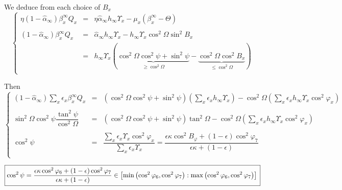\documentclass[aps,onecolumn,10pt]{revtex4}
\begin{document}
\begin{itemize}
We deduce from each choice of $B_x$
\begin{equation}
\left\lbrace
\begin{array}{rcl}
	\eta (1-\hat\alpha_\infty) \beta_x^\infty Q_x & = & \eta \hat\alpha_\infty h_\infty \Upsilon_x - \mu_x\left(\beta_x^\infty - \Theta \right)\\
	\\
	 (1-\hat\alpha_\infty) \beta_x^\infty Q_x & = & \hat\alpha_\infty h_\infty \Upsilon_x -   {h_\infty\Upsilon_x\cos^2\Omega}\sin^2 B_x\\
	 & = &  h_\infty \Upsilon_x \left( \underbrace{\cos^2\Omega \cos^2\psi + \sin^2\psi}_{\geq \cos^2\Omega} - \underbrace{\cos^2\Omega \cos^2 B_x}_{\leq\cos^2\Omega} \right)\\
\end{array}
\right.
\end{equation}

Then
\begin{equation}
\left\lbrace
\begin{array}{rcl}
 (1-\hat\alpha_\infty) \sum_x \epsilon_x \beta_x^\infty Q_x & = & 
 \left(\cos^2\Omega \cos^2\psi + \sin^2\psi\right) \left(\sum_x \epsilon_x h_\infty \Upsilon_x\right) - \cos^2 \Omega \left(\sum_x \epsilon_x h_\infty \Upsilon_x \cos^2 \varphi_x \right)\\
 \\
\sin^2\Omega  \cos^2\psi \dfrac{\tan^2\psi}{\cos^2\Omega} & = & \left(\cos^2\Omega \cos^2\psi + \sin^2\psi\right) \tan^2 \Omega
 - \cos^2 \Omega \left(\sum_x \epsilon_x h_\infty \Upsilon_x \cos^2 \varphi_x \right)\\
 \\
 \cos^2\psi & = & \dfrac{\sum_x \epsilon_x \Upsilon_x \cos^2 \varphi_x }{\sum_x \epsilon_x \Upsilon_x} 
 = \dfrac{\epsilon\kappa\cos^2B_\varphi+(1-\epsilon)\cos^2\varphi_7}{\epsilon\kappa+(1-\epsilon)}\\
\end{array}
\right.
\end{equation}

\begin{equation}
	\boxed
	{
	\cos^2\psi = \dfrac{\epsilon\kappa\cos^2\varphi_6+(1-\epsilon)\cos^2\varphi_7}{\epsilon\kappa+(1-\epsilon)} 
	 \in  \left[\min\left(\cos^2\varphi_6,\cos^2\varphi_7\right):\max\left(\cos^2\varphi_6,\cos^2\varphi_7\right)\right] \\
	}
\end{equation}

\end{itemize}
\end{document}
